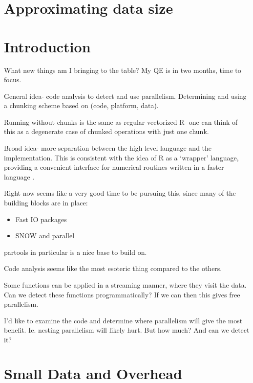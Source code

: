 \documentclass[12pt]{article}
\begin{document}
\section{Approximating data size}


\section{Introduction}

What new things am I bringing to the table? My QE is in two months, time to
focus.

General idea- code analysis to detect and use parallelism. Determining and
using a chunking scheme based on (code, platform, data).

Running without chunks is the same as regular vectorized R- one can think
of this as a degenerate case of chunked operations with just one chunk.

Broad idea- more separation between the high level language
and the implementation. This is consistent with the idea of R as a `wrapper'
language, providing a convenient interface for numerical routines written
in a faster language \cite{chambers2016extending}.

Right now seems like a very good time to be pursuing this, since many of the
building blocks are in place:
\begin{itemize}
    \item Fast IO packages
    \item SNOW and parallel
\end{itemize}

partools in particular is a nice base to build on.

Code analysis seems like the most esoteric thing compared to the others.

Some functions can be applied in a streaming manner, where they visit the
data. Can we detect these functions programmatically? If we can then this
gives free parallelism.

I'd like to examine the code and determine where parallelism will give the
most benefit. Ie. nesting parallelism will likely hurt. But how much? And
can we detect it?

\section{Small Data and Overhead}
\end{document}
